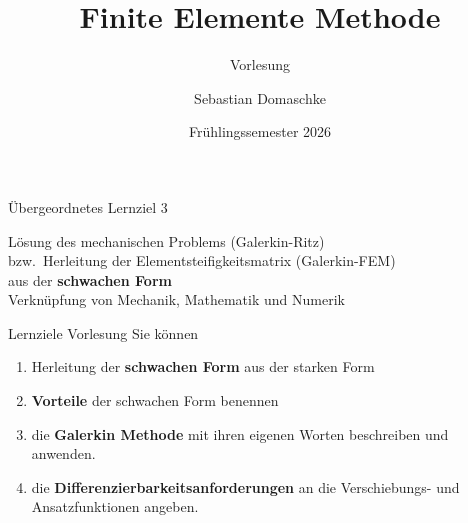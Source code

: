 \documentclass[aspectratio=169,professionalfonts]{beamer}
\title[FEM]{Finite Elemente Methode}
\subtitle{Vorlesung}
\author[ZHAW]{Sebastian Domaschke}
\institute[ZHAW]{Zürcher Hochschule für Angewandte Wissenschaften (ZHAW)}
\date{Frühlingssemester 2026}
\begin{document}
\begin{frame}
  \titlepage
\end{frame}

\begin{frame}{Übergeordnetes Lernziel 3}
  \centering
  \begin{minipage}{0.9\linewidth}
    \centering
    {\LARGE Lösung des mechanischen Problems (Galerkin-Ritz)\\[0.4em]}
    {\LARGE bzw.\ Herleitung der Elementsteifigkeitsmatrix (Galerkin-FEM)\\[0.6em]}
    {\Large aus der \textbf{schwachen Form}\\[0.4em]}
    {\normalsize Verknüpfung von Mechanik, Mathematik und Numerik}
  \end{minipage}
\end{frame}
\begin{frame}{Lernziele Vorlesung}
  \small
  Sie können
  \begin{enumerate}
    \item Herleitung der \textbf{schwachen Form} aus der starken Form
    \item \textbf{Vorteile} der schwachen Form benennen
    \item die \textbf{Galerkin Methode} mit ihren eigenen Worten beschreiben und anwenden.
    \item die \textbf{Differenzierbarkeitsanforderungen} an die Verschiebungs- und Ansatzfunktionen angeben.
  \end{enumerate}
\end{frame}
\end{document}
